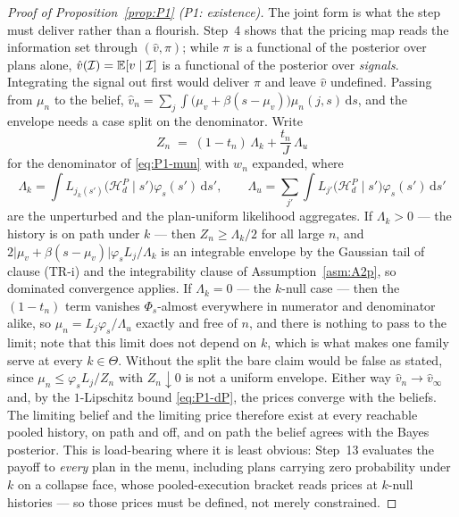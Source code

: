 \begin{proof}[Proof of Proposition~\ref{prop:P1} (P1: existence)]
The joint form is what the step must deliver rather than a flourish. Step~4 shows that the pricing
map reads the information set through $(\hat v,\pi)$; while $\pi$ is a functional of the posterior
over plans alone, $\hat v(\mathcal I) = \mathbb{E}[v \mid \mathcal I]$ is a functional of the posterior over
\emph{signals}. Integrating the signal out first would deliver $\pi$ and leave $\hat v$ undefined.
Passing from $\mu_n$ to the belief, $\hat v_n = \sum_j \int \bigl(\mu_v+\beta(s-\mu_v)\bigr)
\mu_n(j,s)\,\mathrm{d}s$, and the envelope needs a case split on the denominator. Write
\begin{equation}
\label{eq:P1-Zn}
Z_n \;=\; (1-t_n)\,\Lambda_k + \frac{t_n}{J}\,\Lambda_u
\end{equation}
for the denominator of \eqref{eq:P1-mun} with $w_n$ expanded, where
\[
\Lambda_k = \int L_{j_k(s')}\bigl(\mathcal H_d^P \mid s'\bigr)\varphi_s(s')\,\mathrm{d}s',
\qquad
\Lambda_u = \sum_{j'} \int L_{j'}\bigl(\mathcal H_d^P \mid s'\bigr)\varphi_s(s')\,\mathrm{d}s'
\]
are the unperturbed and the plan-uniform likelihood aggregates. If $\Lambda_k > 0$ --- the history is
on path under
$k$ --- then $Z_n \ge \Lambda_k/2$ for all large $n$, and
$2\lvert \mu_v+\beta(s-\mu_v)\rvert\varphi_s L_j/\Lambda_k$ is an integrable envelope by the Gaussian
tail of clause (TR-i) and the integrability clause of Assumption~\ref{asm:A2p}, so dominated
convergence applies. If $\Lambda_k = 0$ --- the $k$-null case --- then the $(1-t_n)$ term vanishes
$\Phi_s$-almost everywhere in numerator and denominator alike, so $\mu_n = L_j\varphi_s/\Lambda_u$
exactly and free of $n$, and there is nothing to pass to the limit; note that this limit does not
depend on $k$, which is what makes one family serve at every $k \in \Theta$. Without the split the
bare claim would be false as stated, since $\mu_n \le \varphi_s L_j/Z_n$ with $Z_n \downarrow 0$ is
not a uniform envelope. Either way $\hat v_n \to \hat v_\infty$ and, by the $1$-Lipschitz bound
\eqref{eq:P1-dP}, the prices converge with the beliefs. The limiting belief and the limiting price
therefore exist at every reachable pooled history, on path and off, and on path the belief agrees
with the Bayes posterior. This is load-bearing where it is least obvious: Step~13 evaluates the
payoff to \emph{every} plan in the menu, including plans carrying zero probability under $k$ on a
collapse face, whose pooled-execution bracket reads prices at $k$-null histories --- so those prices
must be defined, not merely constrained.


\end{proof}
